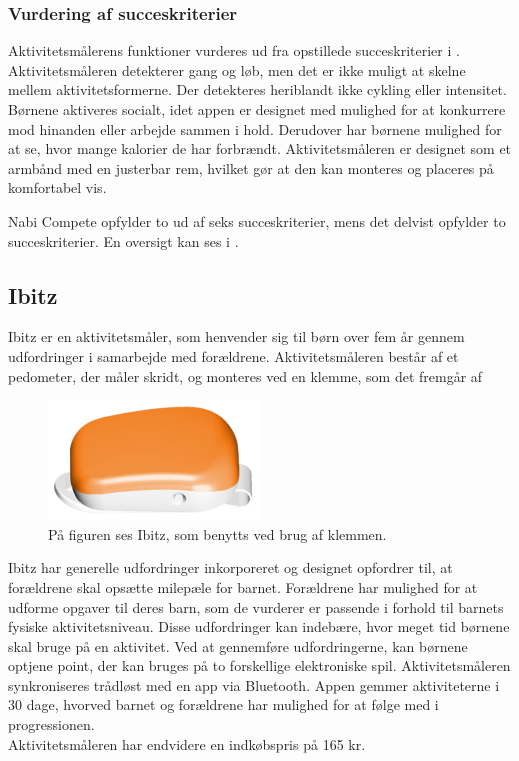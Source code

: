 \subsubsection{Vurdering af succeskriterier}
Aktivitetsmålerens funktioner vurderes ud fra opstillede succeskriterier i . \\
Aktivitetsmåleren detekterer gang og løb, men det er ikke muligt at skelne mellem aktivitetsformerne. Der detekteres heriblandt ikke cykling eller intensitet. Børnene aktiveres socialt, idet appen er designet med mulighed for at konkurrere mod hinanden eller arbejde sammen i hold. Derudover har børnene mulighed for %
at se, hvor mange kalorier de har forbrændt. Aktivitetsmåleren er designet som et armbånd med en justerbar rem, hvilket gør at den kan monteres og placeres på komfortabel vis.~\citep{Fuhu2015,Fuhu_tech2015}

Nabi Compete opfylder to ud af seks succeskriterier, mens det delvist opfylder to succeskriterier. En oversigt kan ses i .

\subsection{Ibitz}
Ibitz er en aktivitetsmåler, som henvender sig til børn over fem år gennem udfordringer i samarbejde med forældrene. Aktivitetsmåleren består af et pedometer, der måler skridt, og monteres ved en klemme, som det fremgår af~
\begin{figure}[H]
	\centering
	\includegraphics[scale=0.65]{figures/aProblemanalyse/ibitz.png}
	\caption{På figuren ses Ibitz, som benytts ved brug af klemmen. \citep{Ibitz_features2016}}
	\label{fig:ibitz}
\end{figure}\vspace{-.25cm}
Ibitz har generelle udfordringer inkorporeret og designet opfordrer til, at forældrene skal opsætte milepæle for barnet. Forældrene har mulighed for at udforme opgaver til deres barn, som de vurderer er passende i forhold til barnets fysiske aktivitetsniveau. Disse udfordringer kan indebære, hvor meget tid børnene skal bruge på en aktivitet. Ved at gennemføre udfordringerne, kan børnene optjene point, der kan bruges på to forskellige elektroniske spil. \newline 
Aktivitetsmåleren synkroniseres trådløst med en app via Bluetooth. Appen gemmer aktiviteterne i 30 dage, hvorved barnet og forældrene har mulighed for at følge med i progressionen.\\
Aktivitetsmåleren har endvidere en indkøbspris på 165 kr. \citep{Ibitz_features2016}

